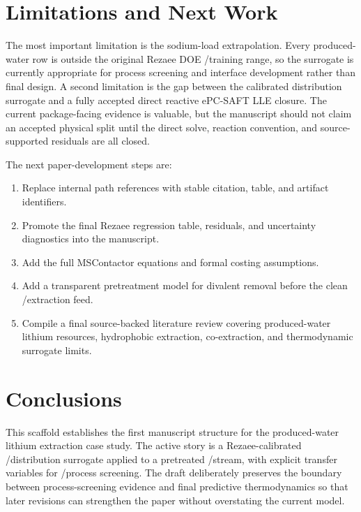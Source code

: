 \section{Limitations and Next Work}
\label{sec:limitations}

The most important limitation is the sodium-load extrapolation. Every produced-water row is outside the original Rezaee DOE \NaIon/\LiIon training range, so the surrogate is currently appropriate for process screening and interface development rather than final design. A second limitation is the gap between the calibrated distribution surrogate and a fully accepted direct reactive ePC-SAFT LLE closure. The current package-facing evidence is valuable, but the manuscript should not claim an accepted physical split until the direct solve, reaction convention, and source-supported residuals are all closed.

The next paper-development steps are:
\begin{enumerate}
    \item Replace internal path references with stable citation, table, and artifact identifiers.
    \item Promote the final Rezaee regression table, residuals, and uncertainty diagnostics into the manuscript.
    \item Add the full \Prommis MSContactor equations and formal \IDAES costing assumptions.
    \item Add a transparent pretreatment model for divalent removal before the clean \LiIon/\NaIon extraction feed.
    \item Compile a final source-backed literature review covering produced-water lithium resources, hydrophobic \DES extraction, \TOPO co-extraction, and thermodynamic surrogate limits.
\end{enumerate}

\section{Conclusions}
\label{sec:conclusions}

This scaffold establishes the first manuscript structure for the produced-water lithium extraction case study. The active story is a Rezaee-calibrated \DES/\TOPO distribution surrogate applied to a pretreated \Smackover \LiIon/\NaIon stream, with explicit transfer variables for \Prommis/\IDAES process screening. The draft deliberately preserves the boundary between process-screening evidence and final predictive thermodynamics so that later revisions can strengthen the paper without overstating the current model.
